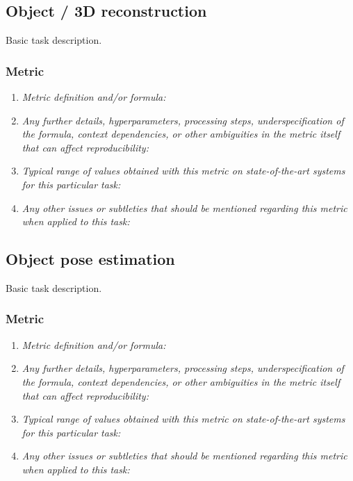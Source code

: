 \documentclass[a4paper,11pt]{article}
\begin{document}
    \subsection{Object / 3D reconstruction} \label{object_3d_reconstruction}
        Basic task description.
        \subsubsection{Metric}
            \begin{enumerate}[label=\alph*.]
                \item \textit{Metric definition and/or formula:}
                \bigskip
                \item \textit{Any further details, hyperparameters, processing steps, underspecification of the formula, context dependencies, or other ambiguities in the metric itself that can affect reproducibility:}
                \bigskip
                \item \textit{Typical range of values obtained with this metric on state-of-the-art systems for this particular task:}
                \bigskip
                \item \textit{Any other issues or subtleties that should be mentioned regarding this metric when applied to this task:}
                \bigskip
            \end{enumerate}

    \subsection{Object pose estimation}
        Basic task description.
        \subsubsection{Metric}
            \begin{enumerate}[label=\alph*.]
                \item \textit{Metric definition and/or formula:}
                \bigskip
                \item \textit{Any further details, hyperparameters, processing steps, underspecification of the formula, context dependencies, or other ambiguities in the metric itself that can affect reproducibility:}
                \bigskip
                \item \textit{Typical range of values obtained with this metric on state-of-the-art systems for this particular task:}
                \bigskip
                \item \textit{Any other issues or subtleties that should be mentioned regarding this metric when applied to this task:}
                \bigskip
            \end{enumerate}
\end{document}

